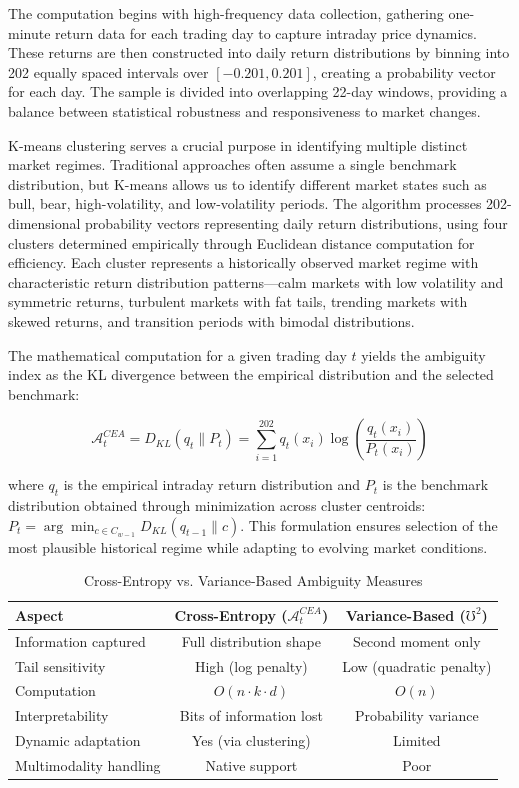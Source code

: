 \documentclass[preprint,12pt,authoryear]{elsarticle}
\begin{document}
The computation begins with high-frequency data collection, gathering one-minute return data for each trading day to capture intraday price dynamics. These returns are then constructed into daily return distributions by binning into 202 equally spaced intervals over $[-0.201, 0.201]$, creating a probability vector for each day. The sample is divided into overlapping 22-day windows, providing a balance between statistical robustness and responsiveness to market changes.

K-means clustering serves a crucial purpose in identifying multiple distinct market regimes. Traditional approaches often assume a single benchmark distribution, but K-means allows us to identify different market states such as bull, bear, high-volatility, and low-volatility periods. The algorithm processes 202-dimensional probability vectors representing daily return distributions, using four clusters determined empirically through Euclidean distance computation for efficiency. Each cluster represents a historically observed market regime with characteristic return distribution patterns—calm markets with low volatility and symmetric returns, turbulent markets with fat tails, trending markets with skewed returns, and transition periods with bimodal distributions.

The mathematical computation for a given trading day $t$ yields the ambiguity index as the KL divergence between the empirical distribution and the selected benchmark:

\begin{equation}
\mathcal{A}^{CEA}_t = D_{KL}\left(q_t \parallel P_t\right) = \sum_{i=1}^{202} q_t(x_i) \log\left(\frac{q_t(x_i)}{P_t(x_i)}\right)
\end{equation}

where $q_t$ is the empirical intraday return distribution and $P_t$ is the benchmark distribution obtained through minimization across cluster centroids: $P_t = \arg\min_{c \in C_{w-1}} D_{KL}(q_{t-1} \parallel c)$. This formulation ensures selection of the most plausible historical regime while adapting to evolving market conditions.

\begin{table}[h]
\centering
\caption{Cross-Entropy vs. Variance-Based Ambiguity Measures}
\label{tab:ambiguity_comparison}
\begin{tabularx}{\textwidth}{Xcc}
\toprule
\textbf{Aspect} & \textbf{Cross-Entropy ($\mathcal{A}^{CEA}_t$)} & \textbf{Variance-Based ($\mho^2$)} \\
\midrule
Information captured & Full distribution shape & Second moment only \\
Tail sensitivity & High (log penalty) & Low (quadratic penalty) \\
Computation & $O(n \cdot k \cdot d)$ & $O(n)$ \\
Interpretability & Bits of information lost & Probability variance \\
Dynamic adaptation & Yes (via clustering) & Limited \\
Multimodality handling & Native support & Poor \\
\bottomrule
\end{tabularx}
\end{table}
\end{document}
